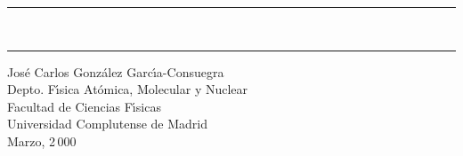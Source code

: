 \echapter

\thispagestyle{empty}  

\vspace*{2cm}
\begin{flushright}
  \rule{.7\linewidth}{1pt}\\
  \Large \mititulo
  \rule{.7\linewidth}{1pt}
\end{flushright}
\vspace*{6cm}
\begin{flushright}
  \large 
Jos{\'{e}} Carlos Gonz{\'{a}}lez Garc{\'{\i}}a-Consuegra\\[15 mm]
Depto. F{\'{\i}}sica At{\'{o}}mica, Molecular y Nuclear\\
Facultad de Ciencias F{\'{\i}}sicas\\
Universidad Complutense de Madrid\\[15 mm]
Marzo, 2\,000
\end{flushright}

\echapter

\endinput
%

